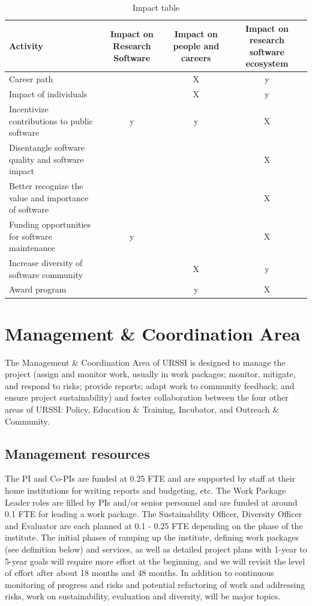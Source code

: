\documentclass[
]{book}
\begin{document}
\begin{table}

\caption{\label{tab:unnamed-chunk-4}Impact table}
\centering
\begin{tabular}[t]{lccc}
\toprule
Activity & Impact on Research Software & Impact on people and careers & Impact on research software ecosystem\\
\midrule
Career path &  & X & y\\
Impact of individuals &  & X & y\\
Incentivize contributions to public software & y & y & X\\
Disentangle software quality and software impact &  &  & X\\
Better recognize the value and importance of software &  &  & X\\
\addlinespace
Funding opportunities for software maintenance & y &  & X\\
Increase diversity of software community &  & X & y\\
Award program &  & y & X\\
\bottomrule
\end{tabular}
\end{table}

\hypertarget{Ch-Org}{%
\chapter{Management \& Coordination Area}\label{Ch-Org}}

The Management \& Coordination Area of URSSI is designed to manage the project (assign and monitor work,
usually in work packages; monitor, mitigate, and respond to risks; provide reports; adapt work to
community feedback; and ensure project sustainability) and foster collaboration between the four
other areas of URSSI: Policy, Education \& Training, Incubator, and Outreach \& Community.

\hypertarget{management-resources}{%
\section{Management resources}\label{management-resources}}

The PI and Co-PIs are funded at 0.25 FTE and are supported by staff at their home institutions for
writing reports and budgeting, etc. The Work Package Leader roles are filled by PIs and/or senior
personnel and are funded at around 0.1 FTE for leading a work package. The Sustainability Officer,
Diversity Officer and Evaluator are each planned at 0.1 - 0.25 FTE depending on the phase of the
institute. The initial phases of ramping up the institute, defining work packages (see definition below)
and services, as well as detailed project plans with 1-year to 5-year goals will require more effort
at the beginning, and we will revisit the level of effort after about 18 months and 48 months.
In addition to continuous monitoring of progress and risks and potential refactoring of work and
addressing risks, work on sustainability, evaluation and diversity, will be major topics.
\end{document}
